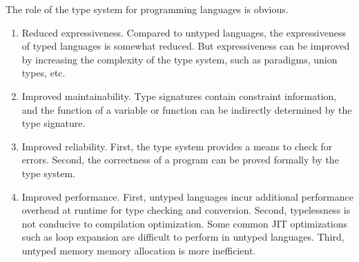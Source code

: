 The role of the type system for programming languages is obvious.

\begin{enumerate}
    \item Reduced expressiveness. Compared to untyped languages, the expressiveness of typed languages is somewhat reduced. But expressiveness can be improved by increasing the complexity of the type system, such as paradigms, union types, etc.
    \item Improved maintainability. Type signatures contain constraint information, and the function of a variable or function can be indirectly determined by the type signature.
    \item Improved reliability. First, the type system provides a means to check for errors. Second, the correctness of a program can be proved formally by the type system.
    \item Improved performance. First, untyped languages incur additional performance overhead at runtime for type checking and conversion. Second, typelessness is not conducive to compilation optimization. Some common JIT optimizations such as loop expansion are difficult to perform in untyped languages. Third, untyped memory memory allocation is more inefficient.
\end{enumerate}

